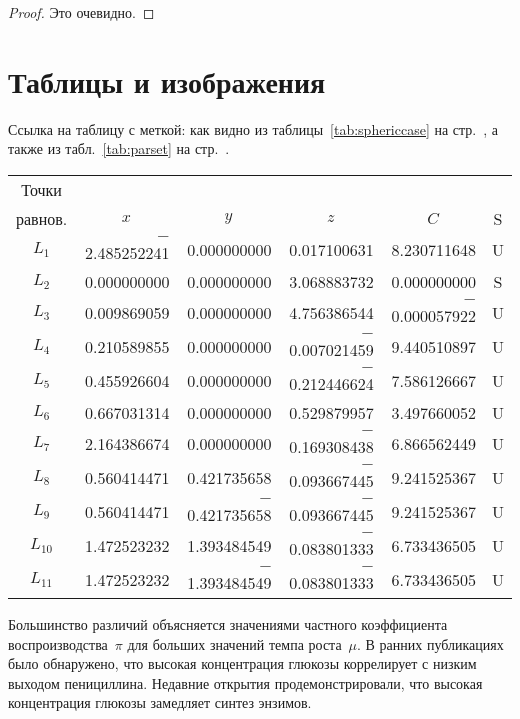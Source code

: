 \documentclass[final,pdftex]{epsilonj}
\numberwithin{equation}{section}
\begin{document}
\begin{proof}
Это очевидно.
\end{proof}

\section{Таблицы и изображения}
Ссылка на таблицу с меткой: как видно из таблицы~\ref{tab:sphericcase} на стр.~\pageref{tab:sphericcase}, а также из табл.~\ref{tab:parset} на стр.~\pageref{tab:parset}.


\begin{table*} \centering
\begin{tabular}{crrrrc}
\toprule
Точки \\
равнов. & \multicolumn{1}{c}{$x$} & \multicolumn{1}{c}{$y$} & \multicolumn{1}{c}{$z$} & \multicolumn{1}{c}{$C$} &
S \\
\midrule
$L_1$ & $-$2.485252241 & 0.000000000 & 0.017100631 & 8.230711648 & U \\
$L_2$ &    0.000000000 & 0.000000000 & 3.068883732 & 0.000000000 & S \\
$L_3$ &    0.009869059 & 0.000000000 & 4.756386544 & $-$0.000057922 & U \\
$L_4$ &    0.210589855 & 0.000000000 & $-$0.007021459 & 9.440510897 & U \\
$L_5$ &    0.455926604 & 0.000000000 & $-$0.212446624 & 7.586126667 & U \\
$L_6$ &    0.667031314 & 0.000000000 & 0.529879957 & 3.497660052 & U \\
$L_7$ &    2.164386674 & 0.000000000 & $-$0.169308438 & 6.866562449 & U \\
$L_8$ &    0.560414471 & 0.421735658 & $-$0.093667445 & 9.241525367 & U \\
$L_9$ &    0.560414471 & $-$0.421735658 & $-$0.093667445 & 9.241525367 & U \\
$L_{10}$ & 1.472523232 & 1.393484549 & $-$0.083801333 & 6.733436505 & U \\
$L_{11}$ & 1.472523232 & $-$1.393484549 & $-$0.083801333 & 6.733436505 & U
\\ \bottomrule
\end{tabular}
\caption{Сферический случай ($I_1=0$, $I_2=0$)}
\label{tab:sphericcase}
\end{table*}

Большинство различий объясняется значениями частного коэффициента воспроизводства~$\pi$ для больших значений темпа роста~$\mu$. В ранних публикациях \cite{lobanov10,burmistrova10} было обнаружено, что высокая концентрация глюкозы коррелирует с низким выходом пенициллина. Недавние открытия \cite{lobanov10,burmistrova10,romanko02,bonar06} продемонстрировали, что высокая концентрация глюкозы замедляет синтез энзимов.
\end{document}
